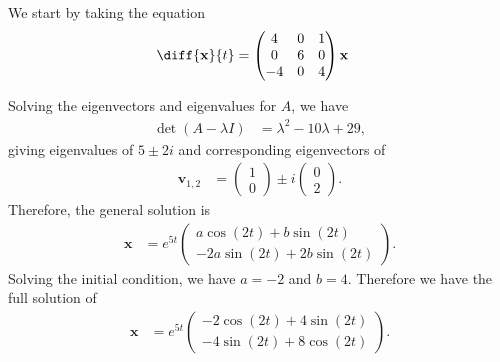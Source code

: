 \documentclass[10pt]{mypackage}
\begin{document}
\begin{solution}[8.2, Problem 42]
  We start by taking the equation
  \begin{align*}
    \diff{\mathbf{x}}{t} &= \begin{pmatrix}4 & 0 & 1 \\ 0 & 6 & 0 \\ -4 & 0 & 4\end{pmatrix} \mathbf{x}
  \end{align*}
\end{solution}
\begin{solution}[8.2, Problem 46]
  Solving the eigenvectors and eigenvalues for $A$, we have
  \begin{align*}
    \det \left( A - \lambda I \right) &= \lambda^2 - 10 \lambda + 29,
  \end{align*}
  giving eigenvalues of $5\pm 2i$ and corresponding eigenvectors of
  \begin{align*}
    \mathbf{v}_{1,2} &= \begin{pmatrix}1\\0\end{pmatrix} \pm i \begin{pmatrix}0\\2\end{pmatrix}.
  \end{align*}
  Therefore, the general solution is
  \begin{align*}
    \mathbf{x} &= e^{5t} \begin{pmatrix}a\cos(2t) + b\sin(2t) \\ -2a\sin(2t) + 2b\sin(2t)\end{pmatrix}.
  \end{align*}
  Solving the initial condition, we have $a = -2$ and $b = 4$. Therefore we have the full solution of
  \begin{align*}
    \mathbf{x} &= e^{5t} \begin{pmatrix}-2\cos(2t) + 4\sin(2t) \\ -4\sin(2t) + 8\cos(2t)\end{pmatrix}.
  \end{align*}
\end{solution}
\end{document}
